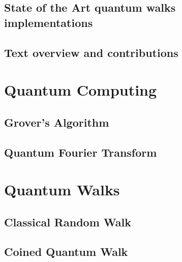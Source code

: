 \documentclass[
oneside,
11pt, a4paper,
footinclude=true,
headinclude=true,
cleardoublepage=empty
]{scrbook}
\begin{document}
\section{State of the Art quantum walks implementations}
\section{Text overview and contributions}

\chapter{Quantum Computing}
\section{Grover's Algorithm}\label{sec:chapGrover}

\section{Quantum Fourier Transform}\label{sec:chapQFT}


\chapter{Quantum Walks}\label{chap:chap3}
\section{Classical Random Walk}\label{sec:chap3ClassicalWalk}

\section{Coined Quantum Walk}\label{sec:chap3Coinedwalk}

\end{document}
